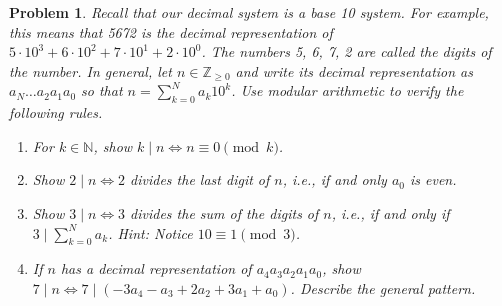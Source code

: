 \documentclass[12pt]{article}
\newtheorem{problem}{Problem}
\numberwithin{problem}{section} %
\theoremstyle{remark}  %
\begin{document}
\vspace{5pt}
    \setcounter{problem}{35}
    \begin{problem}
        Recall that our decimal system is a base 10 system. For example, this means that 5672 is the decimal representation of $5 \cdot 10^3 + 6 \cdot 10^2 + 7 \cdot 10^1 + 2 \cdot 10^0$. The numbers 5, 6, 7, 2 are called the \emph{digits} of the number. In general, let $n\in \mathbb{Z}_{\geq 0}$ and write its decimal representation as $a_N \dots a_2a_1a_0$ so that $n = \sum_{k=0}^{N}a_k 10^k$. Use modular arithmetic to verify the following rules.
        \begin{enumerate}[label=(\alph*)]
            \item For $k\in\mathbb{N}$, show $k \mid n \Leftrightarrow n\equiv 0 \pmod{k}$.
            \item Show $2 \mid n \Leftrightarrow 2$ divides the last digit of $n$, i.e., if and only $a_0$ is even.
            \item Show $3 \mid n \Leftrightarrow 3$ divides the sum of the digits of $n$, i.e., if and only if $3 \mid \sum_{k=0}^{N}a_k$. Hint: Notice $10\equiv1\pmod{3}$.
            \item If $n$ has a decimal representation of $a_4a_3a_2a_1a_0$, show $7 \mid n \Leftrightarrow 7 \mid (-3a_4 - a_3 + 2a_2 + 3a_1 +a_0)$. Describe the general pattern.
        \end{enumerate}
    \end{problem}
\end{document}
